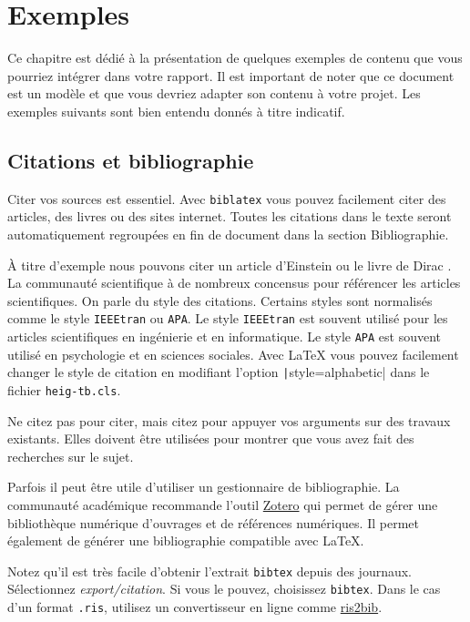 \chapter{Exemples}

Ce chapitre est dédié à la présentation de quelques exemples de contenu que vous pourriez intégrer dans votre rapport. Il est important de noter que ce document est un modèle et que vous devriez adapter son contenu à votre projet. Les exemples suivants sont bien entendu donnés à titre indicatif.

\section{Citations et bibliographie}

Citer vos sources est essentiel. Avec \texttt{biblatex} vous pouvez facilement citer des articles, des livres ou des sites internet. Toutes les citations dans le texte seront automatiquement regroupées en fin de document dans la section \guillemotleft{} Bibliographie\guillemotright.

À titre d'exemple nous pouvons citer un article d'Einstein \cite{einstein} ou le livre de Dirac \cite{dirac}. La communauté scientifique à de nombreux concensus pour référencer les articles scientifiques. On parle du style des citations. Certains styles sont normalisés comme le style \texttt{IEEEtran} ou \texttt{APA}. Le style \texttt{IEEEtran} est souvent utilisé pour les articles scientifiques en ingénierie et en informatique. Le style \texttt{APA} est souvent utilisé en psychologie et en sciences sociales. Avec \LaTeX{} vous pouvez facilement changer le style de citation en modifiant l'option \texttt|style=alphabetic| dans le fichier \texttt{heig-tb.cls}.

Ne citez pas pour citer, mais citez pour appuyer vos arguments sur des travaux existants. Elles doivent être utilisées pour montrer que vous avez fait des recherches sur le sujet.

Parfois il peut être utile d'utiliser un gestionnaire de bibliographie. La communauté académique recommande l'outil \href{https://www.zotero.org/}{Zotero} qui permet de gérer une bibliothèque numérique d'ouvrages et de références numériques. Il permet également de générer une bibliographie compatible avec \LaTeX.

Notez qu'il est très facile d'obtenir l'extrait \texttt{bibtex} depuis des journaux. Sélectionnez \emph{export/citation}. Si vous le pouvez, choisissez \texttt{bibtex}. Dans le cas d'un format \texttt{.ris}, utilisez un convertisseur en ligne comme \href{http://www.bruot.org/ris2bib/}{ris2bib}.

